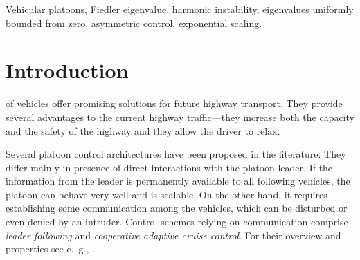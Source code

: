 \documentclass[technote, 10pt, twoside]{IEEEtran}
\theoremstyle{plain}
\theoremstyle{definition}
\theoremstyle{assump}
\begin{document}
\begin{IEEEkeywords}
Vehicular platoons, Fiedler eigenvalue, harmonic instability, eigenvalues uniformly bounded from
zero, asymmetric control, exponential scaling.
\end{IEEEkeywords} 

\IEEEpeerreviewmaketitle
  

 
\section{Introduction} 
 of vehicles offer promising solutions for future
highway transport. They provide several advantages to the current highway
traffic---they increase both the capacity and the safety of the highway and they
allow the driver to relax.

Several platoon control architectures have been proposed in the literature. They
differ mainly in presence of direct interactions with the platoon leader. If the
information from the leader is permanently available to all following vehicles,
the platoon can behave very well and is scalable. On the other hand, it requires
establishing some communication among the vehicles, which can be disturbed or
even denied by an intruder. Control schemes relying on communication comprise
\textit{leader following} and \textit{cooperative adaptive cruise control}. For
their overview and properties see e.~g., \cite{Seiler2004a,
Sebek2011, Milanes2014}.
\end{document}
